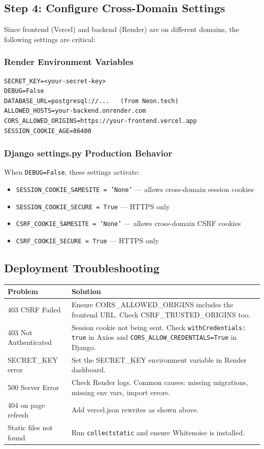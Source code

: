\documentclass[12pt,a4paper]{article}
\begin{document}
\subsection{Step 4: Configure Cross-Domain Settings}

Since frontend (Vercel) and backend (Render) are on different domains, the following settings are critical:

\subsubsection{Render Environment Variables}
\begin{lstlisting}
SECRET_KEY=<your-secret-key>
DEBUG=False
DATABASE_URL=postgresql://...   (from Neon.tech)
ALLOWED_HOSTS=your-backend.onrender.com
CORS_ALLOWED_ORIGINS=https://your-frontend.vercel.app
SESSION_COOKIE_AGE=86400
\end{lstlisting}

\subsubsection{Django settings.py Production Behavior}
When \texttt{DEBUG=False}, these settings activate:
\begin{itemize}
    \item \texttt{SESSION\_COOKIE\_SAMESITE = 'None'} — allows cross-domain session cookies
    \item \texttt{SESSION\_COOKIE\_SECURE = True} — HTTPS only
    \item \texttt{CSRF\_COOKIE\_SAMESITE = 'None'} — allows cross-domain CSRF cookies
    \item \texttt{CSRF\_COOKIE\_SECURE = True} — HTTPS only
\end{itemize}

\subsection{Deployment Troubleshooting}

\begin{center}
\begin{tabularx}{\textwidth}{lX}
\toprule
\textbf{Problem} & \textbf{Solution} \\
\midrule
403 CSRF Failed & Ensure CORS\_ALLOWED\_ORIGINS includes the frontend URL. Check CSRF\_TRUSTED\_ORIGINS too. \\
403 Not Authenticated & Session cookie not being sent. Check \texttt{withCredentials: true} in Axios and \texttt{CORS\_ALLOW\_CREDENTIALS=True} in Django. \\
SECRET\_KEY error & Set the SECRET\_KEY environment variable in Render dashboard. \\
500 Server Error & Check Render logs. Common causes: missing migrations, missing env vars, import errors. \\
404 on page refresh & Add vercel.json rewrites as shown above. \\
Static files not found & Run \texttt{collectstatic} and ensure Whitenoise is installed. \\
\bottomrule
\end{tabularx}
\end{center}
\end{document}

